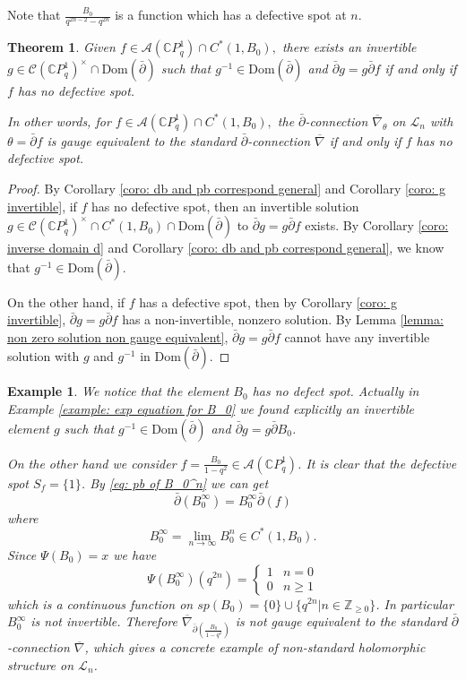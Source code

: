 \documentclass[12pt]{article}
\newtheorem{theorem}[definition]{Theorem}
\newtheorem{example}{Example}
\numberwithin{equation}{section}
\def\Dom{{\mathrm {Dom}}}
\def\pb{\bar{\partial}}
\def\nb{\bar{\nabla}_\theta}
\def\nb{\overline{\nabla}_\theta}
\def\Z{{\mathbb Z}}
\def\C{{\mathbb C}}
\def\A{\mathcal{A}}
\def\L{\mathcal{L}}
\begin{document}
Note that $\frac{B_0}{q^{2n-2} - q^{2n}}$ is a function which has a defective spot at $n.$



\begin{theorem}\label{thm: gauge equivalent to trivial criterion}
    Given $f \in  \A(\C P^1_q)\cap C^*(1, B_0),$ there exists an invertible $g\in\mathcal{C}(\C P^1_q)^{\times}\cap \Dom(\pb)$ such that $g^{-1}\in \Dom(\pb)$ and $\pb g = g \pb f$ if and only if $f$ has no defective spot.

    In other words, for $f \in  \A(\C P^1_q)\cap C^*(1, B_0),$ the $\pb$-connection $\nb$ on $\L_n$ with $\theta=\pb f$ is gauge equivalent to the standard $\pb$-connection $\overline{\nabla}$ if and only if $f$ has no defective spot.
\end{theorem}
\begin{proof}
    By Corollary \ref {coro: db and pb correspond general} and Corollary \ref{coro: g invertible}, if $f$ has no defective spot, then an invertible solution $g \in\mathcal{C}(\C P^1_q)^{\times}\cap  C^*(1, B_0)\cap \Dom(\pb)$ to $\pb g = g \pb f$ exists. By Corollary \ref{coro: inverse domain d} and  Corollary \ref {coro: db and pb correspond general}, we know that $g^{-1}\in \Dom(\pb)$.
    
    On the other hand, if $f$ has a defective spot, then by Corollary \ref{coro: g invertible}, $\pb g = g \pb f$  has a  non-invertible, nonzero solution. By Lemma \ref{lemma: non zero solution non gauge equivalent}, $\pb g = g \pb f$ cannot have any invertible solution with $g$ and $g^{-1}$ in $\Dom(\pb)$.
\end{proof}

\begin{example}\label{example: non gauge equivalent to zero}
We notice that the element $B_0$ has no defect spot. Actually in Example \ref{example: exp equation for B_0} we found explicitly an invertible element $g$ such that $g^{-1}\in \Dom(\pb)$  and $\pb g=g \pb B_0$.

    On the other hand we consider $f=\frac{B_0}{1-q^2}\in \A(\C P^1_q)$. It is clear that the defective spot $S_f=\{1\}$. By \eqref{eq: pb of B_0^n} we can get
    \begin{equation}
    \pb(B_0^{\infty})=B_0^{\infty}\pb(f)
    \end{equation}
    where 
    $$
    B_0^{\infty}=\lim_{n\to\infty}B_0^n\in C^*(1, B_0).
    $$
    Since $\Psi(B_0)=x$ we have
    $$
    \Psi(B_0^{\infty})(q^{2n})=\begin{cases}1 &n=0\\0 & n\geq 1
    \end{cases}
    $$
    which is a continuous function on $sp(B_0)=\{0\} \cup \{q^{2n} | n \in \Z_{\geq 0} \}$.
    In particular $B_0^{\infty}$ is not invertible. Therefore $\overline{\nabla}_{\pb(\frac{B_0}{1-q^2})}$ is not gauge equivalent to the standard $\pb$-connection $\overline{\nabla}$, which gives a concrete example of non-standard holomorphic structure on $\L_n$.
\end{example}
\end{document}

